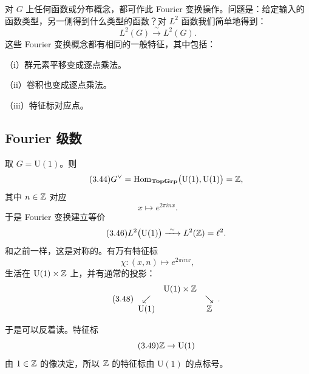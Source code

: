 对 $G$ 上任何函数或分布概念，都可作此 Fourier 变换操作。问题是：给定输入的函数类型，另一侧得到什么类型的函数？对 $L^2$ 函数我们简单地得到：
\begin{equation}\tag{3.43}
L^2(G)\xrightarrow{\ \sim\ }L^2(G).
\end{equation}
这些 Fourier 变换概念都有相同的一般特征，其中包括：

（i）群元素平移变成逐点乘法。

（ii）卷积也变成逐点乘法。

（iii）特征标对应点。

\subsection{Fourier 级数}

取 $G=\mathrm{U}(1)$。则
\begin{equation}\tag{3.44}
G^{\vee}=\mathrm{Hom}_{\mathbf{TopGrp}}\bigl(\mathrm{U}(1),\mathrm{U}(1)\bigr)=\mathbb{Z},
\end{equation}
其中 $n\in\mathbb{Z}$ 对应
\begin{equation}\tag{3.45}
x\mapsto e^{2\pi inx}.
\end{equation}
于是 Fourier 变换建立等价
\begin{equation}\tag{3.46}
L^2\bigl(\mathrm{U}(1)\bigr)\xrightarrow{\ \sim\ }L^2(\Z)=\ell^2.
\end{equation}
和之前一样，这是对称的。有万有特征标
\begin{equation}\tag{3.47}
\chi\colon (x,n)\mapsto e^{2\pi inx},
\end{equation}
生活在 $\mathrm{U}(1)\times\mathbb{Z}$ 上，并有通常的投影：
\begin{equation}\tag{3.48}
\begin{array}{ccc}
& \mathrm{U}(1)\times\mathbb{Z} &\\
\swarrow & & \searrow\\
\mathrm{U}(1) & & \mathbb{Z}
\end{array}.
\end{equation}

于是可以反着读。特征标
\begin{equation}\tag{3.49}
\mathbb{Z}\to\mathrm{U}(1)
\end{equation}
由 $1\in\mathbb{Z}$ 的像决定，所以 $\mathbb{Z}$ 的特征标由 $\mathrm{U}(1)$ 的点标号。

